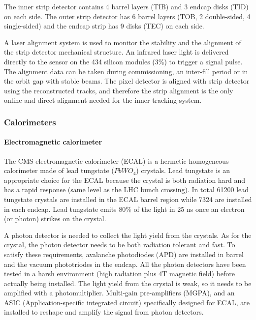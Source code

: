 The inner strip detector contains 4 barrel layers (TIB) and 3 endcap disks (TID) on each side. The outer strip detector has 6 barrel layers (TOB, 2 double-sided, 4 single-sided) and the endcap strip has 9 disks (TEC) on each side.

A laser alignment system\cite{Sirunyan:2017rbc} is used to monitor the stability and the alignment of the strip detector mechanical structure. An infrared laser light is delivered directly to the sensor on the 434 silicon modules (3\%) to trigger a signal pulse. The alignment data can be taken during commissioning, an inter-fill period or in the orbit gap with stable beams. The pixel detector is aligned with strip detector using the reconstructed tracks, and therefore the strip alignment is the only online and direct alignment needed for the inner tracking system. 

\subsubsection{Calorimeters}

\paragraph{Electromagnetic calorimeter}
The CMS electromagnetic calorimeter (ECAL) is a hermetic homogeneous calorimeter made of lead tungstate ($PbWO_{4}$) crystals. Lead tungstate is an appropriate choice for the ECAL because the crystal is both radiation hard and has a rapid response (same level as the LHC bunch crossing). In total 61200 lead tungstate crystals are installed in the ECAL barrel region while 7324 are installed in each endcap. Lead tungstate emits 80\% of the light in 25 ns once an electron (or photon) strikes on the crystal.

A photon detector is needed to collect the light yield from the crystals. As for the crystal, the photon detector needs to be both radiation tolerant and fast. To satisfy these requirements, avalanche photodiodes (APD) are installed in barrel and the vacuum phototriodes in the endcap. All the photon detectors have been tested in a harsh environment (high radiation plus 4T magnetic field) before actually being installed. The light yield from the crystal is weak, so it needs to be amplified with a photomultiplier. Multi-gain pre-amplifiers (MGPA), and an ASIC (Application-specific integrated circuit) specifically designed for ECAL, are installed to reshape and amplify the signal from photon detectors.

